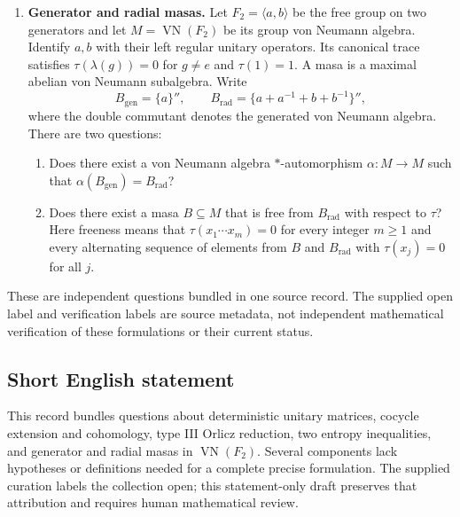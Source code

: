 \documentclass[11pt]{article}
\begin{document}
\begin{enumerate}
\item \textbf{Generator and radial masas.} Let \(F_2=\langle a,b\rangle\) be the free group on two generators and let \(M=\operatorname{VN}(F_2)\) be its group von Neumann algebra. Identify \(a,b\) with their left regular unitary operators. Its canonical trace satisfies \(\tau(\lambda(g))=0\) for \(g\ne e\) and \(\tau(1)=1\). A masa is a maximal abelian von Neumann subalgebra. Write
\[
 B_{\mathrm{gen}}=\{a\}'',\qquad
 B_{\mathrm{rad}}=\{a+a^{-1}+b+b^{-1}\}'',
\]
where the double commutant denotes the generated von Neumann algebra. There are two questions:
\begin{enumerate}
\item Does there exist a von Neumann algebra \(*\)-automorphism \(\alpha:M\to M\) such that \(\alpha(B_{\mathrm{gen}})=B_{\mathrm{rad}}\)?
\item Does there exist a masa \(B\subseteq M\) that is free from \(B_{\mathrm{rad}}\) with respect to \(\tau\)? Here freeness means that \(\tau(x_1\cdots x_m)=0\) for every integer \(m\geq1\) and every alternating sequence of elements from \(B\) and \(B_{\mathrm{rad}}\) with \(\tau(x_j)=0\) for all \(j\).
\end{enumerate}
\end{enumerate}
These are independent questions bundled in one source record. The supplied open label and verification labels are source metadata, not independent mathematical verification of these formulations or their current status.
\subsection{Short English statement}
This record bundles questions about deterministic unitary matrices, cocycle extension and cohomology, type III Orlicz reduction, two entropy inequalities, and generator and radial masas in \(\operatorname{VN}(F_2)\). Several components lack hypotheses or definitions needed for a complete precise formulation. The supplied curation labels the collection open; this statement-only draft preserves that attribution and requires human mathematical review.
\end{document}
